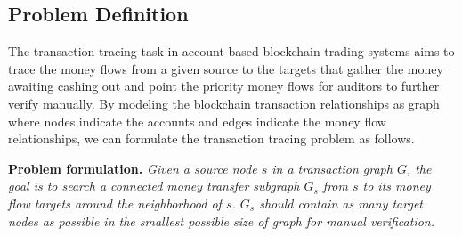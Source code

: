\subsection{Problem Definition}
\label{sec:problem_define}
The transaction tracing task in account-based blockchain trading systems aims to trace the money flows from a given source to the targets that gather the money awaiting cashing out and point the priority money flows for auditors to further verify manually. By modeling the blockchain transaction relationships as graph where nodes indicate the accounts and edges indicate the money flow relationships, we can formulate the transaction tracing problem as follows. 

\textbf{Problem formulation.} \textit{Given a source node $s$ in a transaction graph $G$, the goal is to search a connected money transfer subgraph $G_{s}$ from $s$ to its money flow targets around the neighborhood of $s$. $G_{s}$ should contain as many target nodes as possible in the smallest possible size of graph for manual verification.}


